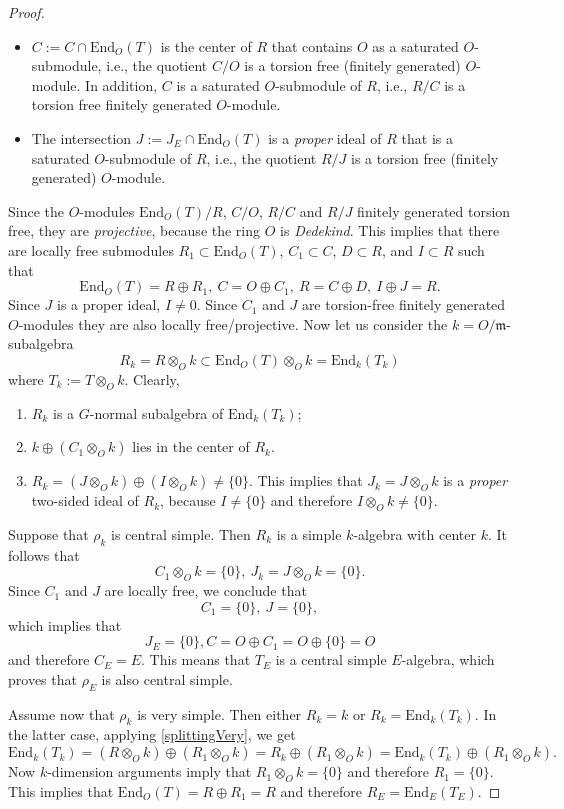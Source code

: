 \documentclass[12pt,a4paper,reqno]{amsart}
\def\End{\mathrm{End}}
\theoremstyle{definition}
\begin{document}
\begin{proof}
\begin{itemize}
\item[(i)]
$C:=C\cap  \End_O(T)$ is the center of $R$   that contains $O$ as a saturated $O$-submodule, i.e.,  the quotient $C/O$ is a 
 torsion free (finitely generated) $O$-module.  In addition, $C$ is a saturated $O$-submodule of $R$, i.e., $R/C$ is a torsion free
 finitely generated $O$-module.
\item[(ii)]
The intersection  $J:=J_E\cap  \End_O(T)$ is
a {\sl proper} ideal of $R$  that is a saturated $O$-submodule of $R$,
i.e., the quotient $R/J$ is a  torsion free (finitely generated) $O$-module.
\end{itemize}
Since  the $O$-modules $\End_O(T)/R$, $C/O$, $R/C$ and $R/J$ finitely generated torsion free, they are {\sl projective}, because the ring $O$ is  {\sl Dedekind}. This implies that there are locally free submodules
$R_1\subset \End_O(T)$, $C_1\subset C$,  $D\subset R$, and $I\subset R$ such that
\begin{equation}
\label{splittingVery}
\End_O(T)=R\oplus R_1, \ C=O\oplus C_1, \  R=C\oplus D, \  I\oplus J=R.
\end{equation}
Since $J$ is a proper ideal, $I \ne 0$.
Since $C_1$ and $J$ are torsion-free finitely generated $O$-modules they are also locally free/projective.
Now let us consider the $k=O/\mathfrak{m}$-subalgebra
$$R_{k}= R\otimes_O k \subset \End_O(T)\otimes_O k=\End_{k}(T_{k})$$
where $T_k:=T\otimes_O k$.
Clearly,
\begin{enumerate}
\item[(1)]
 $R_{k}$ is a $G$-normal subalgebra of $\End_{k}(T_{k})$;
 \item[(2)]
 $k\oplus (C_1\otimes_O k)$ lies in the center of $R_{k}$.
 \item[(3)]
 $R_{k}=(J\otimes_O k)\oplus (I\otimes_O k)\ne \{0\}$.
 This implies that
 $J_{k}=J\otimes_O k$ is a {\sl proper} two-sided ideal of $R_{k}$,
 because $I \ne \{0\}$ and therefore $I\otimes_O k\ne \{0\}$.
 \end{enumerate}
 Suppose that $\rho_{k}$ is  central simple. Then $R_{k}$ is a simple 
 $k$-algebra with center $k$. It follows that
 $$C_1\otimes_ O k=\{0\}, \ J_{k}=J\otimes_ O k=\{0\}.$$
 Since $C_1$ and $J$ are locally free, we conclude that
 $$C_1=\{0\},  \ J=\{0\},$$ 
 which implies that 
 $$J_E=\{0\},  C=O\oplus C_1=O\oplus \{0\}=O$$
 and therefore $C_E=E$. This means that $T_E$ is a central simple $E$-algebra, which proves 
 that $\rho_E$ is also central simple.
 
 Assume now that $\rho_{k}$ is  very simple. Then either $R_{k}=k$
 or $R_{k}=\End_{k}(T_{k})$.
 In the latter case, applying
 \eqref{splittingVery}, we get
 $$\End_{k}(T_{k})=(R\otimes_O k)\oplus (R_1\otimes_O k)=R_{k}\oplus (R_1\otimes_O k)=\End_{k}(T_{k})\oplus (R_1\otimes_O k).$$
 Now  $k$-dimension arguments imply that $R_1\otimes_O k=\{0\}$ and therefore $R_1=\{0\}$. This implies that
 $\End_O(T)=R\oplus R_1=R$ and therefore $R_E=\End_E(T_E)$.
 

\end{proof}
\end{document}

